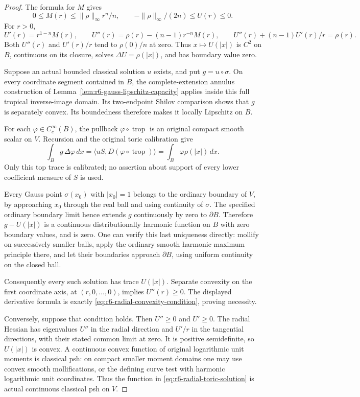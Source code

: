 \documentclass[11pt,a4paper]{article}
\numberwithin{equation}{section}
\theoremstyle{definition}
\theoremstyle{remark}
\begin{document}
\begin{proof}
The formula for $M$ gives
\[
 0\le M(r)\le\|\rho\|_\infty r^n/n,
       \qquad -\|\rho\|_\infty/(2n)\le U(r)\le0.
\]
For $r>0$,
\[
 U'(r)=r^{1-n}M(r),\qquad
 U''(r)=\rho(r)-(n-1)r^{-n}M(r),\qquad
 U''(r)+(n-1)U'(r)/r=\rho(r).
\]
Both $U''(r)$ and $U'(r)/r$ tend to $\rho(0)/n$ at zero.
Thus $x\mapsto U(|x|)$ is $C^2$ on $B$, continuous on its closure,
solves $\Delta U=\rho(|x|)$, and has boundary value zero.

Suppose an actual bounded classical solution $u$ exists, and put
$g=u\circ\sigma$. On every coordinate segment contained in $B$,
the complete-extension annulus construction of
Lemma~\ref{lem:r6-gauss-lipschitz-capacity} applies inside this full
tropical inverse-image domain. Its two-endpoint Shilov comparison
shows that $g$ is separately convex. Its boundedness therefore
makes it locally Lipschitz on $B$.

For each $\varphi\in C_c^\infty(B)$, the pullback
$\varphi\circ\operatorname{trop}$ is an original compact smooth
scalar on $V$. Recursion and the original toric calibration give
\[
 \int_B g\,\Delta\varphi\,dx
  =\langle uS,D(\varphi\circ\operatorname{trop})\rangle
  =\int_B\varphi\rho(|x|)\,dx.
\]
Only this top trace is calibrated; no assertion about support of
every lower coefficient measure of $S$ is used.

Every Gauss point $\sigma(x_0)$ with $|x_0|=1$ belongs to the ordinary
boundary of $V$, by approaching $x_0$ through the real ball and using
continuity of $\sigma$. The specified ordinary boundary limit hence
extends $g$ continuously by zero to $\partial B$. Therefore
$g-U(|x|)$ is a continuous distributionally harmonic function on
$B$ with zero boundary values, and is zero. One can verify this last
uniqueness directly: mollify on successively smaller balls, apply
the ordinary smooth harmonic maximum principle there, and let their
boundaries approach $\partial B$, using uniform continuity on the
closed ball.

Consequently every such solution has trace $U(|x|)$. Separate
convexity on the first coordinate axis, at $(r,0,\ldots,0)$,
implies $U''(r)\ge0$. The displayed derivative formula is exactly
\eqref{eq:r6-radial-convexity-condition}, proving necessity.

Conversely, suppose that condition holds. Then $U''\ge0$ and
$U'\ge0$. The radial Hessian has eigenvalues $U''$ in the radial
direction and $U'/r$ in the tangential directions, with their stated
common limit at zero. It is positive semidefinite, so $U(|x|)$ is
convex. A continuous convex function of original logarithmic unit
moments is classical psh: on compact smaller moment domains one
may use convex smooth mollifications, or the defining curve test
with harmonic logarithmic unit coordinates. Thus the function in
\eqref{eq:r6-radial-toric-solution} is actual continuous classical
psh on $V$.


\end{proof}
\end{document}
